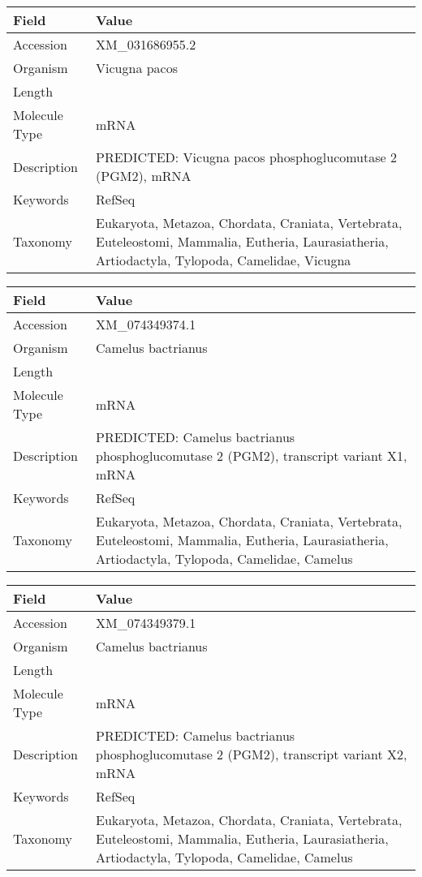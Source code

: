 \documentclass[10pt]{article}
\begin{document}
\vspace{1em}
{\footnotesize
\begin{longtable}{>{\raggedright\arraybackslash}p{4.5cm} >{\raggedright\arraybackslash}p{11.5cm}}
\textbf{Field} & \textbf{Value} \\
\hline
Accession & XM\_031686955.2 \\
Organism & Vicugna pacos \\
Length & 2234 \\
Molecule Type & mRNA \\
Description & PREDICTED: Vicugna pacos phosphoglucomutase 2 (PGM2), mRNA \\
Keywords & RefSeq \\
Taxonomy & Eukaryota, Metazoa, Chordata, Craniata, Vertebrata, Euteleostomi, Mammalia, Eutheria, Laurasiatheria, Artiodactyla, Tylopoda, Camelidae, Vicugna \\
\end{longtable}
}

\vspace{1em}
{\footnotesize
\begin{longtable}{>{\raggedright\arraybackslash}p{4.5cm} >{\raggedright\arraybackslash}p{11.5cm}}
\textbf{Field} & \textbf{Value} \\
\hline
Accession & XM\_074349374.1 \\
Organism & Camelus bactrianus \\
Length & 4924 \\
Molecule Type & mRNA \\
Description & PREDICTED: Camelus bactrianus phosphoglucomutase 2 (PGM2), transcript variant X1, mRNA \\
Keywords & RefSeq \\
Taxonomy & Eukaryota, Metazoa, Chordata, Craniata, Vertebrata, Euteleostomi, Mammalia, Eutheria, Laurasiatheria, Artiodactyla, Tylopoda, Camelidae, Camelus \\
\end{longtable}
}

\vspace{1em}
{\footnotesize
\begin{longtable}{>{\raggedright\arraybackslash}p{4.5cm} >{\raggedright\arraybackslash}p{11.5cm}}
\textbf{Field} & \textbf{Value} \\
\hline
Accession & XM\_074349379.1 \\
Organism & Camelus bactrianus \\
Length & 4841 \\
Molecule Type & mRNA \\
Description & PREDICTED: Camelus bactrianus phosphoglucomutase 2 (PGM2), transcript variant X2, mRNA \\
Keywords & RefSeq \\
Taxonomy & Eukaryota, Metazoa, Chordata, Craniata, Vertebrata, Euteleostomi, Mammalia, Eutheria, Laurasiatheria, Artiodactyla, Tylopoda, Camelidae, Camelus \\
\end{longtable}
}
\end{document}
